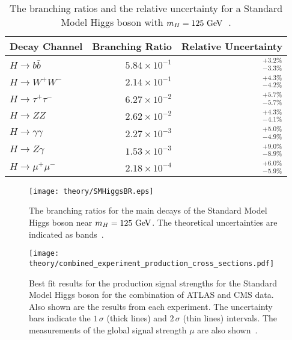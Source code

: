 \begin{table}[htpb]
 \centering
 \caption[The branching ratios and the relative uncertainty for a Standard Model Higgs boson with $m_{H}=125~\GeV$.]{%
  The branching ratios and the relative uncertainty for a Standard Model Higgs boson with $m_{H}=125~\GeV$~\cite{PDG2018:Ch11}.}
 \begin{tabular}{@{}lrr@{}} \toprule
  Decay Channel           & Branching Ratio       & Relative Uncertainty \\ \midrule
  $H\to b\bar{b}$         & $5.84 \times 10^{-1}$ & $_{-3.3\%}^{+3.2\%}$ \\
  \addlinespace[0.3em]
  $H\to W^{+}W^{-}$       & $2.14 \times 10^{-1}$ & $_{-4.2\%}^{+4.3\%}$ \\
  \addlinespace[0.3em]
  $H\to \tau^{+}\tau^{-}$ & $6.27 \times 10^{-2}$ & $_{-5.7\%}^{+5.7\%}$ \\
  \addlinespace[0.3em]
  $H\to ZZ$               & $2.62 \times 10^{-2}$ & $_{-4.1\%}^{+4.3\%}$ \\
  \addlinespace[0.3em]
  $H\to \gamma\gamma$     & $2.27 \times 10^{-3}$ & $_{-4.9\%}^{+5.0\%}$ \\
  \addlinespace[0.3em]
  $H\to Z\gamma$          & $1.53 \times 10^{-3}$ & $_{-8.9\%}^{+9.0\%}$ \\
  \addlinespace[0.3em]
  $H\to \mu^{+}\mu^{-}$   & $2.18 \times 10^{-4}$ & $_{-5.9\%}^{+6.0\%}$ \\
  \bottomrule
 \end{tabular}\label{table:Higgs_BRs}%
\end{table}

\begin{figure}
 \centering
 \texttt{[image: theory/SMHiggsBR.eps]}
 \caption[The branching ratios for the main decays of the Standard Model Higgs boson near $m_{H}=125~\GeV$.]{%
  The branching ratios for the main decays of the Standard Model Higgs boson near $m_{H}=125~\GeV$.
  The theoretical uncertainties are indicated as bands~\cite{PDG2018:Ch11}.}
 \label{fig:Higgs_BRs}
\end{figure}

\begin{figure}[htbp]
 \centering
 \texttt{[image: theory/combined\_experiment\_production\_cross\_sections.pdf]}
 \caption[Best fit results for the production signal strengths for the Standard Model Higgs boson for the combination of ATLAS and CMS data.]{%
  Best fit results for the production signal strengths for the Standard Model Higgs boson for the combination of ATLAS and CMS data.
  Also shown are the results from each experiment.
  The uncertainty bars indicate the $1\,\sigma$ (thick lines) and $2\,\sigma$ (thin lines) intervals.
  The measurements of the global signal strength $\mu$ are also shown~\cite{Pieri:2016szr}.}
 \label{fig:combined_experiment_production_cross_sections}
\end{figure}

